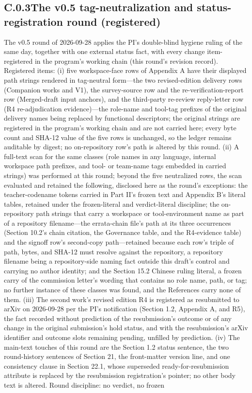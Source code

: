 \documentclass[11pt]{article}
\begin{document}
\subsection*{C.0.3\quad The v0.5 tag-neutralization and status-registration round (registered)}
\noindent The v0.5 round of 2026-09-28 applies the PI's double-blind hygiene ruling of the same day, together with one external status fact, with every change item-registered in the program's working chain (this round's revision record). Registered items: (i) five workspace-face rows of Appendix A have their displayed path strings rendered in tag-neutral form—the two revised-edition delivery rows (Companion works and V1), the survey-source row and the re-verification-report row (Merged-draft input anchors), and the third-party re-review reply-letter row (R4 re-adjudication evidence)—the role-name and tool-tag prefixes of the original delivery names being replaced by functional descriptors; the original strings are registered in the program's working chain and are not carried here; every byte count and SHA-12 value of the five rows is unchanged, so the ledger remains auditable by digest; no on-repository row's path is altered by this round. (ii) A full-text scan for the same classes (role names in any language, internal workspace path prefixes, and tool- or team-name tags embedded in carried strings) was performed at this round; beyond the five neutralized rows, the scan evaluated and retained the following, disclosed here as the round's exceptions: the teacher-codename tokens carried in Part II's frozen text and Appendix B's literal tables, retained under the frozen-literal and verdict-literal discipline; the on-repository path strings that carry a workspace or tool-environment name as part of a repository filename—the errata-chain file's path at its three occurrences (Section 10.2's chain citation, the Governance table, and the R4-evidence table) and the signoff row's second-copy path—retained because each row's triple of path, bytes, and SHA-12 must resolve against the repository, a repository filename being a repository-side naming fact outside this draft's control and carrying no author identity; and the Section 15.2 Chinese ruling literal, a frozen carry of the commission letter's wording that contains no role name, path, or tag; no further instance of these classes was found, and the References carry none of them. (iii) The second work's revised edition R4 is registered as resubmitted to arXiv on 2026-09-28 per the PI's notification (Section 1.2, Appendix A, and R5), the fact recorded without prediction of the resubmission's outcome or of any change in the original submission's hold status, and with the resubmission's arXiv identifier and outcome slots remaining pending, unfilled by prediction. (iv) The main-text touches of this round are the Section 1.2 status sentence, the two round-history sentences of Section 21, the front-matter version line, and one consistency clause in Section 22.1, whose superseded ready-for-resubmission attribute is replaced by the resubmission registration's pointer; no other body text is altered. Round discipline: no verdict, no frozen 
\end{document}
